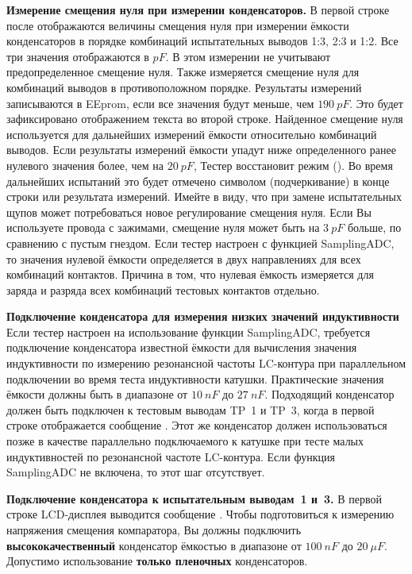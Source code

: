 \begin{enumerate}
{{\item \textbf{ Измерение смещения нуля при измерении конденсаторов.}
В первой строке после  отображаются величины смещения нуля при измерении ёмкости конденсаторов в порядке 
комбинаций испытательных выводов 1:3, 2:3 и 1:2. Все три значения отображаются в \(pF\). В этом измерении не 
учитывают предопределенное смещение нуля. Также измеряется смещение нуля для комбинаций выводов в противоположном 
порядке. Результаты измерений записываются в EEprom, если все значения будут меньше, чем \(190~pF\). Это будет 
зафиксировано отображением текста  во второй  строке. Найденное смещение нуля используется для дальнейших 
измерений ёмкости относительно комбинаций выводов. Если результаты измерений ёмкости упадут ниже определенного 
ранее нулевого значения более, чем на \(20~pF\), Тестер восстановит режим  (). 
Во время дальнейших испытаний это будет отмечено символом \inquotes{\_} (подчеркивание) в конце строки или результата измерений. Имейте в 
виду, что при замене испытательных щупов может потребоваться новое регулирование смещения нуля. Если Вы 
используете провода с зажимами, смещение нуля может быть на \(3~pF\) больше, по сравнению с пустым гнездом.
Если тестер настроен с функцией SamplingADC, то значения нулевой ёмкости определяется в двух направлениях для
всех комбинаций контактов. Причина в том, что нулевая ёмкость измеряется для заряда и разряда всех комбинаций
тестовых контактов отдельно.

\item \textbf{ Подключение конденсатора для измерения низких значений индуктивности}
Если тестер настроен на использование функции SamplingADC, требуется подключение конденсатора известной ёмкости
для вычисления значения индуктивности по измерению резонансной частоты LC-контура при параллельном подключении
во время теста индуктивности катушки.
Практические значения ёмкости должны быть в диапазоне от \(10~nF\) до \(27~nF\).
Подходящий конденсатор должен быть подключен к тестовым выводам TP~1 и TP~3, когда в первой строке отображается
сообщение .
Этот же конденсатор должен использоваться позже в качестве параллельно подключаемого к катушке при тесте малых 
индуктивностей по резонансной частоте LC-контура.
Если функция SamplingADC не включена, то этот шаг отсутствует.

\item \textbf{ Подключение конденсатора к испытательным выводам~1 и~3.}
В первой строке LCD-дисплея выводится сообщение . Чтобы подготовиться 
к измерению напряжения смещения компаратора, Вы должны подключить \textbf{ высококачественный} 
конденсатор ёмкостью в диапазоне от  \(100~nF\) до \(20~\mu F\).
Допустимо использование \textbf{ только пленочных} конденсаторов.

}}
\end{enumerate}
